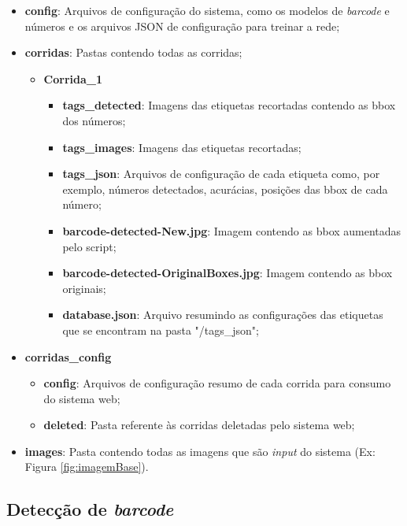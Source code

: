 \begin{itemize}
    \item \textbf{config}: Arquivos de configuração do sistema, como os modelos de \textit{barcode} e números e os arquivos JSON de configuração para treinar a rede;
    \item \textbf{corridas}: Pastas contendo todas as corridas;
    \begin{itemize}
        \item \textbf{Corrida\_1}
            \begin{itemize}
                \item \textbf{tags\_detected}: Imagens das etiquetas recortadas contendo as bbox dos números;
                \item \textbf{tags\_images}: Imagens das etiquetas recortadas;
                \item \textbf{tags\_json}: Arquivos  de configuração de cada etiqueta como, por exemplo, números detectados, acurácias, posições das bbox de cada número;
                \item \textbf{barcode-detected-New.jpg}: Imagem contendo as bbox aumentadas pelo script;
                \item \textbf{barcode-detected-OriginalBoxes.jpg}: Imagem contendo as bbox originais;
                \item \textbf{database.json}: Arquivo resumindo as configurações das etiquetas que se encontram na pasta "/tags\_json";
            \end{itemize}
    \end{itemize}
     \item \textbf{corridas\_config}
        \begin{itemize}
            \item \textbf{config}: Arquivos de configuração resumo de cada corrida para consumo do sistema web;
            \item \textbf{deleted}: Pasta referente às corridas deletadas pelo sistema web;
        \end{itemize}
    \item \textbf{images}: Pasta contendo todas as imagens que são \textit{input} do sistema (Ex: Figura \ref{fig:imagemBase}).
\end{itemize}


\subsection{Detecção de \textit{barcode}}


